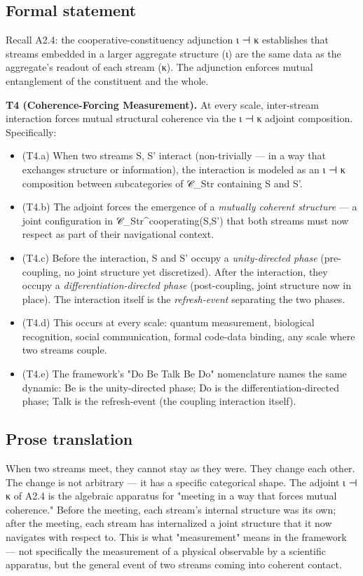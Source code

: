\documentclass[11pt, openany]{book}
\begin{document}
\subsection{Formal statement}

Recall A2.4: the cooperative-constituency adjunction ι ⊣ κ establishes that streams embedded in a larger aggregate structure (ι) are the same data as the aggregate's readout of each stream (κ). The adjunction enforces mutual entanglement of the constituent and the whole.

\textbf{T4 (Coherence-Forcing Measurement).} At every scale, inter-stream interaction forces mutual structural coherence via the ι ⊣ κ adjoint composition. Specifically:

\begin{itemize}
\item (T4.a) When two streams S, S' interact (non-trivially --- in a way that exchanges structure or information), the interaction is modeled as an ι ⊣ κ composition between subcategories of 𝒞\_\allowbreak{}Str containing S and S'.
\item (T4.b) The adjoint forces the emergence of a \textit{mutually coherent structure} --- a joint configuration in 𝒞\_\allowbreak{}Str\textasciicircum{}{cooperating(S,S')} that both streams must now respect as part of their navigational context.
\item (T4.c) Before the interaction, S and S' occupy a \textit{unity-directed phase} (pre-coupling, no joint structure yet discretized). After the interaction, they occupy a \textit{differentiation-directed phase} (post-coupling, joint structure now in place). The interaction itself is the \textit{refresh-event} separating the two phases.
\item (T4.d) This occurs at every scale: quantum measurement, biological recognition, social communication, formal code-data binding, any scale where two streams couple.
\item (T4.e) The framework's "Do Be Talk Be Do" nomenclature names the same dynamic: Be is the unity-directed phase; Do is the differentiation-directed phase; Talk is the refresh-event (the coupling interaction itself).
\end{itemize}

\subsection{Prose translation}

When two streams meet, they cannot stay as they were. They change each other. The change is not arbitrary --- it has a specific categorical shape. The adjoint ι ⊣ κ of A2.4 is the algebraic apparatus for "meeting in a way that forces mutual coherence." Before the meeting, each stream's internal structure was its own; after the meeting, each stream has internalized a joint structure that it now navigates with respect to. This is what "measurement" means in the framework --- not specifically the measurement of a physical observable by a scientific apparatus, but the general event of two streams coming into coherent contact.
\end{document}

